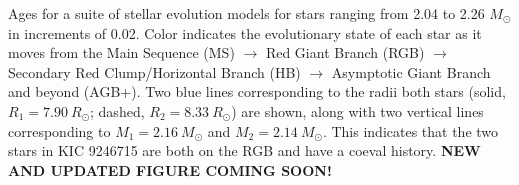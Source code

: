 \label{fig:mesa} Ages for a suite of stellar evolution models for stars ranging from 2.04 to 2.26 $M_{\odot}$ in increments of 0.02. Color indicates the evolutionary state of each star as it moves from the Main Sequence (MS) $\rightarrow$ Red Giant Branch (RGB) $\rightarrow$ Secondary Red Clump/Horizontal Branch (HB) $\rightarrow$ Asymptotic Giant Branch and beyond (AGB+). Two blue lines corresponding to the radii both stars (solid, $R_1 = 7.90 \ R_\odot$; dashed, $R_2 = 8.33 \ R_\odot$) are shown, along with two vertical lines corresponding to $M_1 = 2.16 \ M_\odot$ and $M_2 = 2.14 \ M_\odot$. This indicates that the two stars in KIC 9246715 are both on the RGB and have a coeval history. \textbf{NEW AND UPDATED FIGURE COMING SOON!}

  
  